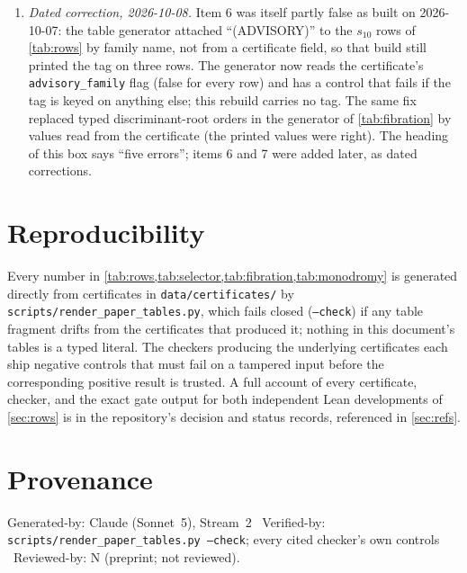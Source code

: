 \documentclass[11pt,a4paper]{article}
\theoremstyle{remark}
\begin{document}
\begin{correctionbox}
\begin{enumerate}
  $s_{10}$ lattice certificate a DRAFT, and the ``(ADVISORY)'' tags on the $s_{10}$ rows of
  \cref{tab:rows,tab:selector}, were true when written on 2026-09-29 and were superseded later that day by a
  ruling that made the value-identical certificate LIVE; the certificates were re-emitted without the flag on
  2026-10-07 and the two tables, which are generated from them, now show none. No value in any table changed.
  The prose sentences are left as written and are dated by this item; nothing in this paper ranks the two
  families, and that was never conditional on the flag.
\item \emph{Dated correction, 2026-10-08.} Item 6 was itself partly false as built on 2026-10-07: the table
  generator attached ``(ADVISORY)'' to the $s_{10}$ rows of \cref{tab:rows} by family name, not from a
  certificate field, so that build still printed the tag on three rows. The generator now reads the
  certificate's \texttt{advisory\_family} flag (false for every row) and has a control that fails if the tag
  is keyed on anything else; this rebuild carries no tag. The same fix replaced typed discriminant-root orders
  in the generator of \cref{tab:fibration} by values read from the certificate (the printed values were
  right). The heading of this box says ``five errors''; items 6 and 7 were added later, as dated corrections.
\end{enumerate}
\end{correctionbox}

\section{Reproducibility}

Every number in \cref{tab:rows,tab:selector,tab:fibration,tab:monodromy} is generated directly from
certificates in \texttt{data/certificates/} by \texttt{scripts/render\_paper\_tables.py}, which fails
closed (\texttt{--check}) if any table fragment drifts from the certificates that produced it; nothing in
this document's tables is a typed literal. The checkers producing the underlying certificates each ship
negative controls that must fail on a tampered input before the corresponding positive result is trusted.
A full account of every certificate, checker, and the exact gate output for both independent Lean
developments of \cref{sec:rows} is in the repository's decision and status records, referenced in
\cref{sec:refs}.

\section*{Provenance}
Generated-by: Claude (Sonnet~5), Stream~2 \textbar\ Verified-by: \texttt{scripts/render\_paper\_tables.py
--check}; every cited checker's own controls \textbar\ Reviewed-by: N (preprint; not reviewed).
\end{document}
